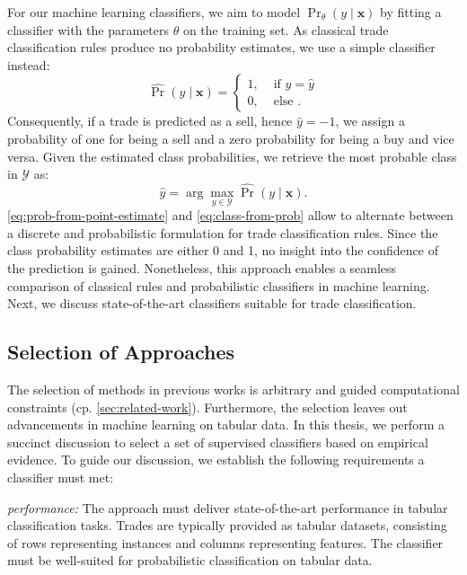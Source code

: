 For our machine learning classifiers, we aim to model $\Pr_{\theta}(y \mid \mathbf{x})$ by fitting a classifier with the parameters $\theta$ on the training set. As classical trade classification rules produce no probability estimates, we use a simple classifier instead:
\begin{equation}
    \widehat{\operatorname{Pr}}(y\mid \mathbf{x})= \begin{cases}1, & \text { if } y=\hat{y} \\ 0, & \text { else }.\end{cases}
    \label{eq:prob-from-point-estimate}
\end{equation}
Consequently, if a trade is predicted as a sell, hence $\hat{y} = -1$, we assign a probability of one for being a sell and a zero probability for being a buy and vice versa. Given the estimated class probabilities, we retrieve the most probable class in $\mathcal{Y}$ as:
\begin{equation}
    \hat{y}=\arg\max_{y \in \mathcal{Y}} \widehat{\operatorname{Pr}}(y \mid \mathbf{x}).
    \label{eq:class-from-prob}
\end{equation}
\cref{eq:prob-from-point-estimate} and \cref{eq:class-from-prob} allow to alternate between a discrete and probabilistic formulation for trade classification rules. Since the class probability estimates are either 0
and 1, no insight into the confidence of the prediction is gained. Nonetheless, this approach enables a seamless comparison of classical rules and probabilistic classifiers in machine learning. Next, we discuss state-of-the-art classifiers suitable for trade classification.

\subsection{Selection of Approaches}\label{sec:selection-of-approaches}

The selection of methods in previous works is arbitrary and guided computational constraints (cp. \cref{sec:related-work}). Furthermore, the selection leaves out advancements in machine learning on tabular data.
In this thesis, we perform a succinct discussion to select a set of supervised classifiers based on empirical evidence. To guide our discussion, we establish the following requirements a classifier must met:


\emph{performance:} The approach must deliver state-of-the-art performance in tabular classification tasks. Trades are typically provided as tabular datasets, consisting of rows representing instances and columns representing features. The classifier must be well-suited for probabilistic classification on tabular data.


